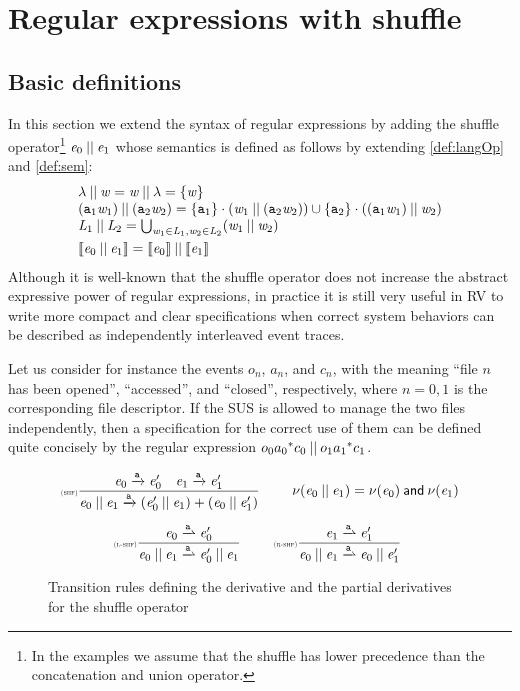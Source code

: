 \section{Regular expressions with shuffle}\label{sec:shuffle}

\subsection{Basic definitions}
In this section we extend the syntax of regular expressions by adding the shuffle operator\footnote{In the examples we assume that the shuffle has lower precedence than the concatenation and union operator.} $\mathit {e}_0\mathbin{||}\mathit {e}_1$ whose semantics is defined as follows by extending \cref{def:langOp} and \cref{def:sem}:
\[
 \begin{array}{l}
  \lambda \mathbin{||} \mathit {w} = \mathit {w} \mathbin{||} \lambda = \{\mathit {w}\}                                                                                                      \\
  (\mathtt {a}_1\mathit {w}_1) \mathbin{||} (\mathtt {a}_2\mathit {w}_2) = \{ \mathtt {a}_1  \} \mathbin{\cdot} (\mathit {w}_1 \mathbin{||} (\mathtt {a}_2\mathit {w}_2)) \cup \{\mathtt {a}_2\}\mathbin{\cdot}((\mathtt {a}_1\mathit {w}_1)\mathbin{||}\mathit {w}_2) \\
  \mathit {L}_1\mathbin{||}\mathit {L}_2=\bigcup_{\mathit {w}_1\in\mathit {L}_1,\mathit {w}_2\in\mathit {L}_2}(\mathit {w}_1\mathbin{||}\mathit {w}_2)                                                                     \\[1ex]
  \left\llbracket{\ensuremath{\mathit {e}}_0\mathbin{||}\ensuremath{\mathit {e}}_1}\right\rrbracket=\left\llbracket{\ensuremath{\mathit {e}}_0}\right\rrbracket\mathbin{||}\left\llbracket{\ensuremath{\mathit {e}}_1}\right\rrbracket
 \end{array}
\]
Although it is well-known that the shuffle operator does not increase the abstract expressive power of regular expressions, in practice it is still very useful in RV to write more compact and clear
specifications when correct system behaviors can be described as independently interleaved event traces.

Let us consider for instance the events $o_n$, $a_n$, and $c_n$, with the meaning
``file $n$ has been opened'', ``accessed'', and ``closed'', respectively, where $n=0,1$ is the corresponding file descriptor.
If the SUS is allowed to manage the two files independently, then a specification for the correct use of them can be defined quite concisely by the regular expression $o_0{a_0}^* c_0\mathbin{||} o_1{a_1}^* c_1$.

\begin{figure}[h]
 $$
  \begin{array}{c}
   \Rule{shf}{\re_0\der{\sym}\re'_0\quad\re_1\der{\sym}\re'_1}{\re_0\shuffleop\re_1\der{\sym}(\re'_0\shuffleop\re_1)\orop(\re_0\shuffleop\re'_1)}{}\qquad \hasEps{\re_0\shuffleop\re_1}=\hasEps{\re_0}\conj\hasEps{\re_1} \\[4ex]
   \Rule{l-shf}{\re_0\parDer{\sym}\re'_0}{\re_0\shuffleop\re_1\parDer{\sym}\re'_0\shuffleop\re_1}{} \qquad
   \Rule{r-shf}{\re_1\parDer{\sym}\re'_1}{\re_0\shuffleop\re_1\parDer{\sym}\re_0\shuffleop\re'_1}{}
  \end{array}
 $$
 \caption{Transition rules defining the derivative and the partial derivatives for the shuffle operator}
 \label{fig:shfParDer}
\end{figure}

